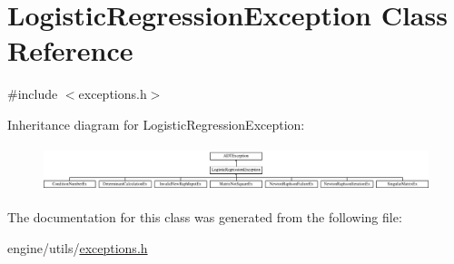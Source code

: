\hypertarget{classLogisticRegressionException}{
\section{LogisticRegressionException Class Reference}
\label{classLogisticRegressionException}
}


{\ttfamily \#include $<$exceptions.h$>$}

Inheritance diagram for LogisticRegressionException:\begin{figure}[H]
\begin{center}
\leavevmode
\includegraphics[height=1.32597cm]{classLogisticRegressionException}
\end{center}
\end{figure}


The documentation for this class was generated from the following file:\begin{DoxyCompactItemize}
\item 
engine/utils/\hyperlink{exceptions_8h}{exceptions.h}\end{DoxyCompactItemize}
